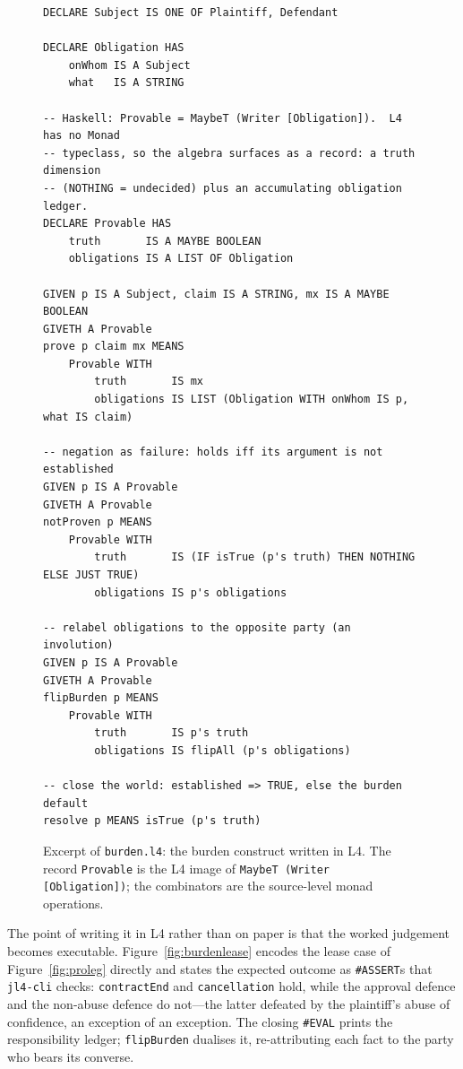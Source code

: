 \documentclass[sigconf,nonacm]{acmart}
\newcommand{\code}[1]{\texttt{\small #1}}
\begin{document}
\begin{figure}[t]
\begin{lstlisting}
DECLARE Subject IS ONE OF Plaintiff, Defendant

DECLARE Obligation HAS
    onWhom IS A Subject
    what   IS A STRING

-- Haskell: Provable = MaybeT (Writer [Obligation]).  L4 has no Monad
-- typeclass, so the algebra surfaces as a record: a truth dimension
-- (NOTHING = undecided) plus an accumulating obligation ledger.
DECLARE Provable HAS
    truth       IS A MAYBE BOOLEAN
    obligations IS A LIST OF Obligation

GIVEN p IS A Subject, claim IS A STRING, mx IS A MAYBE BOOLEAN
GIVETH A Provable
prove p claim mx MEANS
    Provable WITH
        truth       IS mx
        obligations IS LIST (Obligation WITH onWhom IS p, what IS claim)

-- negation as failure: holds iff its argument is not established
GIVEN p IS A Provable
GIVETH A Provable
notProven p MEANS
    Provable WITH
        truth       IS (IF isTrue (p's truth) THEN NOTHING ELSE JUST TRUE)
        obligations IS p's obligations

-- relabel obligations to the opposite party (an involution)
GIVEN p IS A Provable
GIVETH A Provable
flipBurden p MEANS
    Provable WITH
        truth       IS p's truth
        obligations IS flipAll (p's obligations)

-- close the world: established => TRUE, else the burden default
resolve p MEANS isTrue (p's truth)
\end{lstlisting}
\caption{Excerpt of \code{burden.l4}: the burden construct written in L4. The
record \code{Provable} is the L4 image of \code{MaybeT (Writer
[Obligation])}; the combinators are the source-level monad operations.}
\label{fig:burdenl4}
\end{figure}

The point of writing it in L4 rather than on paper is that the worked
judgement becomes executable. Figure~\ref{fig:burdenlease} encodes the lease
case of Figure~\ref{fig:proleg} directly and states the expected outcome as
\code{\#ASSERT}s that \code{jl4-cli} checks: \code{contractEnd} and
\code{cancellation} hold, while the approval defence and the non-abuse
defence do not---the latter defeated by the plaintiff's abuse of confidence,
an exception of an exception. The closing \code{\#EVAL} prints the
responsibility ledger; \code{flipBurden} dualises it, re-attributing each
fact to the party who bears its converse.
\end{document}
